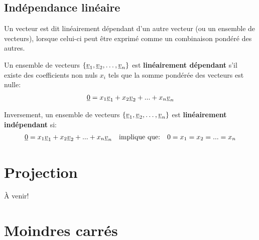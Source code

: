 \subsection{Indépendance linéaire}
\label{sec:lindep}

Un vecteur est dit linéairement dépendant d'un autre vecteur (ou un ensemble de vecteurs), lorsque celui-ci peut être exprimé comme un combinaison pondéré des autres. 


Un ensemble de vecteurs $\left\{ \underline{v}_1, \underline{v}_2, \hdots, \underline{v}_n \right\}$ est \textbf{linéairement dépendant} s'il existe des coefficients non nuls $x_i$ tels que la somme pondérée des vecteurs est nulle:
\begin{align}
\underline{0} = x_1 \underline{v}_1 + x_2 \underline{v}_2 + ... + x_n \underline{v}_n
\end{align}

Inversement, un ensemble de vecteurs $\left\{ \underline{v}_1, \underline{v}_2, \hdots, \underline{v}_n \right\}$ est \textbf{linéairement indépendant} si:
\begin{align}
\underline{0} = x_1 \underline{v}_1 + x_2 \underline{v}_2 + ... + x_n \underline{v}_n
\quad
\text{implique que:}
\quad
0 = x_1 = x_2 = ... = x_n 
\end{align}







\section{Projection}
\label{sec:projectionmatrix}

À venir!

\newpage
\section{Moindres carrés}
\label{sec:moindrecarre}

